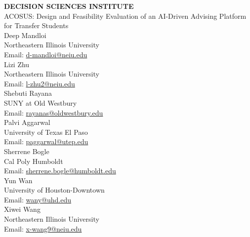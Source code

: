 \documentclass[letterpaper,11pt]{article}
\begin{document}
\begin{center}
\textbf{DECISION SCIENCES INSTITUTE}\\[6pt]
ACOSUS: Design and Feasibility Evaluation of an AI-Driven Advising Platform for Transfer Students
\\[12pt]
Deep Mandloi\\
Northeastern Illinois University\\
Email: \href{mailto:d-mandloi@neiu.edu}{d-mandloi@neiu.edu}\\[6pt]
Lizi Zhu\\
Northeastern Illinois University\\
Email: \href{mailto:l-zhu2@neiu.edu}{l-zhu2@neiu.edu}\\[6pt]
Shebuti Rayana\\
SUNY at Old Westbury\\
Email: \href{mailto:rayanas@oldwestbury.edu}{rayanas@oldwestbury.edu}\\[6pt]
Palvi Aggarwal\\
University of Texas El Paso\\
Email: \href{mailto:paggarwal@utep.edu}{paggarwal@utep.edu}\\[6pt]
Sherrene Bogle\\
Cal Poly Humboldt\\
Email: \href{mailto:sherrene.bogle@humboldt.edu}{sherrene.bogle@humboldt.edu}\\[6pt]
Yun Wan\\
University of Houston-Downtown\\
Email: \href{mailto:wany@uhd.edu}{wany@uhd.edu}\\[6pt]
Xiwei Wang\\
Northeastern Illinois University\\
Email: \href{mailto:x-wang9@neiu.edu}{x-wang9@neiu.edu}
\end{center}

\bigskip
\end{document}
